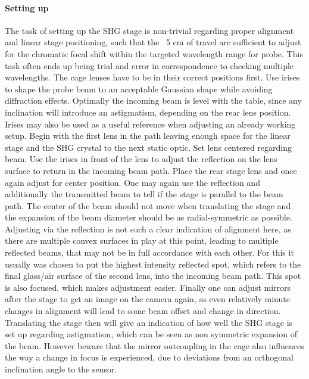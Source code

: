 \documentclass[twoside,openright,listof=numbered]{scrreprt}
\begin{document}
\paragraph{Setting up}
The task of setting up the SHG stage is non-trivial regarding proper alignment and linear stage positioning, such that the ~5 cm of travel are sufficient to adjust for the chromatic focal shift within the targeted wavelength range for probe. This task often ends up being trial and error in correspondence to checking multiple wavelengths. The cage lenses have to be in their correct positions first.\newline
Use irises to shape the probe beam to an acceptable Gaussian shape while avoiding diffraction effects. Optimally the incoming beam is level with the table, since any inclination will introduce an astigmatism, depending on the rear lens position. Irises may also be used as a useful reference when adjusting an already working setup.\newline
Begin with the first lens in the path leaving enough space for the linear stage and the SHG crystal to the next static optic. Set lens centered regarding beam. Use the irises in front of the lens to adjust the reflection on the lens surface to return in the incoming beam path.\newline
Place the rear stage lens and once again adjust for center position. One may again use the reflection and additionally the transmitted beam to tell if the stage is parallel to the beam path. The center of the beam should not move when translating the stage and the expansion of the beam diameter should be as radial-symmetric as possible. Adjusting via the reflection is not such a clear indication of alignment here, as there are multiple convex surfaces in play at this point, leading to multiple reflected beams, that may not be in full accordance with each other. For this it usually was chosen to put the highest intensity reflected spot, which refers to the final glass/air surface of the second lens, into the incoming beam path. This spot is also focused, which makes adjustment easier.\newline
Finally one can adjust mirrors after the stage to get an image on the camera again, as even relatively minute changes in alignment will lead to some beam offset and change in direction. Translating the stage then will give an indication of how well the SHG stage is set up regarding astigmatism, which can be seen as non symmetric expansion of the beam. However beware that the mirror outcoupling in the cage also influences the way a change in focus is experienced, due to deviations from an orthogonal inclination angle to the sensor.
\end{document}
